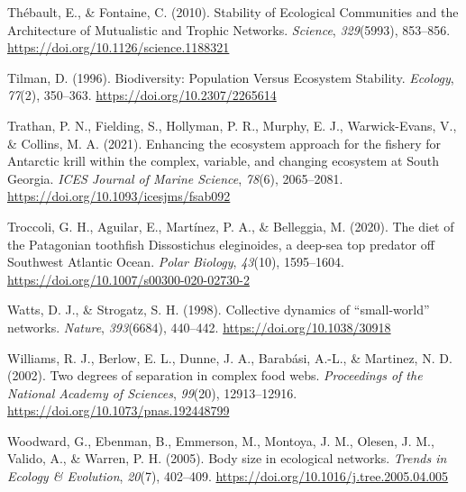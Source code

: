 \documentclass[preprint, 3p,
authoryear]{elsarticle} %
\newlength{\cslhangindent}
\newlength{\cslentryspacingunit} %
\newenvironment{CSLReferences}[2] %
 {%
  \setlength{\parindent}{0pt}
  \ifodd #1
  \let\oldpar\par
  \def\par{\hangindent=\cslhangindent\oldpar}
  \fi
  \setlength{\parskip}{#2\cslentryspacingunit}
 }%
 {}
\begin{document}
\begin{CSLReferences}{1}{0}
\leavevmode{}%
Thébault, E., \& Fontaine, C. (2010). Stability of {Ecological
Communities} and the {Architecture} of {Mutualistic} and {Trophic
Networks}. \emph{Science}, \emph{329}(5993), 853--856.
\url{https://doi.org/10.1126/science.1188321}

\leavevmode{}%
Tilman, D. (1996). Biodiversity: {Population Versus Ecosystem
Stability}. \emph{Ecology}, \emph{77}(2), 350--363.
\url{https://doi.org/10.2307/2265614}

\leavevmode{}%
Trathan, P. N., Fielding, S., Hollyman, P. R., Murphy, E. J.,
Warwick-Evans, V., \& Collins, M. A. (2021). Enhancing the ecosystem
approach for the fishery for {Antarctic} krill within the complex,
variable, and changing ecosystem at {South Georgia}. \emph{ICES Journal
of Marine Science}, \emph{78}(6), 2065--2081.
\url{https://doi.org/10.1093/icesjms/fsab092}

\leavevmode{}%
Troccoli, G. H., Aguilar, E., Martínez, P. A., \& Belleggia, M. (2020).
The diet of the {Patagonian} toothfish {Dissostichus} eleginoides, a
deep-sea top predator off {Southwest Atlantic Ocean}. \emph{Polar
Biology}, \emph{43}(10), 1595--1604.
\url{https://doi.org/10.1007/s00300-020-02730-2}

\leavevmode{}%
Watts, D. J., \& Strogatz, S. H. (1998). Collective dynamics of
{``small-world''} networks. \emph{Nature}, \emph{393}(6684), 440--442.
\url{https://doi.org/10.1038/30918}

\leavevmode{}%
Williams, R. J., Berlow, E. L., Dunne, J. A., Barabási, A.-L., \&
Martinez, N. D. (2002). Two degrees of separation in complex food webs.
\emph{Proceedings of the National Academy of Sciences}, \emph{99}(20),
12913--12916. \url{https://doi.org/10.1073/pnas.192448799}

\leavevmode{}%
Woodward, G., Ebenman, B., Emmerson, M., Montoya, J. M., Olesen, J. M.,
Valido, A., \& Warren, P. H. (2005). Body size in ecological networks.
\emph{Trends in Ecology \& Evolution}, \emph{20}(7), 402--409.
\url{https://doi.org/10.1016/j.tree.2005.04.005}

\end{CSLReferences}
\end{document}
